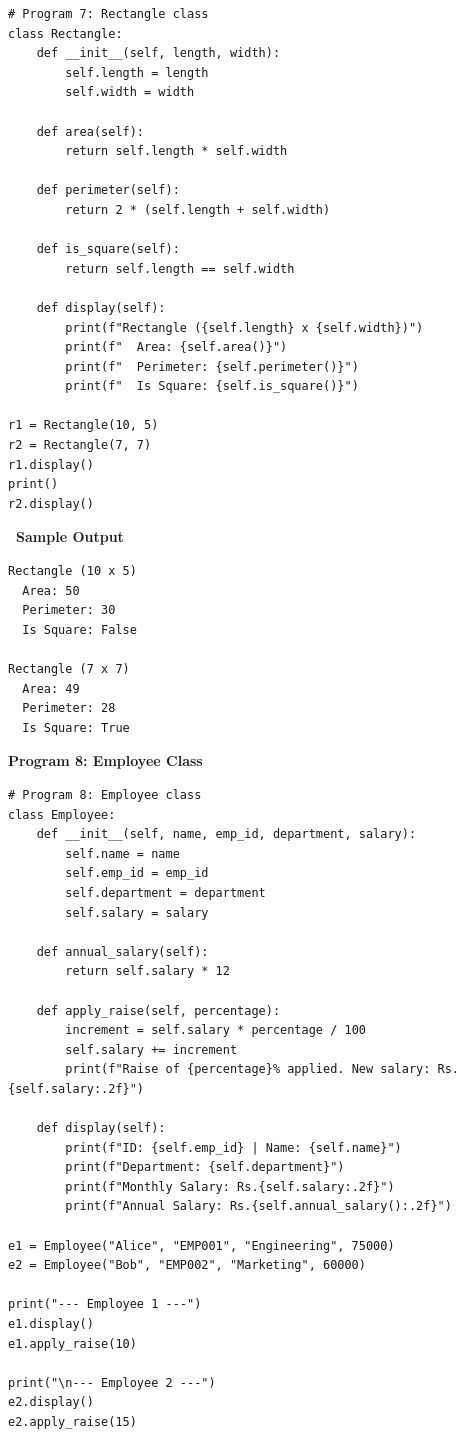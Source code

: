 \documentclass[12pt,a4paper]{article}
\newcommand{\outhead}{\noindent\colorbox{cmrgreen!25}%
  {\textbf{\small\color{cmrdark}~Sample Output~}}\par\vspace{-1pt}}
\begin{document}
\begin{lstlisting}
# Program 7: Rectangle class
class Rectangle:
    def __init__(self, length, width):
        self.length = length
        self.width = width

    def area(self):
        return self.length * self.width

    def perimeter(self):
        return 2 * (self.length + self.width)

    def is_square(self):
        return self.length == self.width

    def display(self):
        print(f"Rectangle ({self.length} x {self.width})")
        print(f"  Area: {self.area()}")
        print(f"  Perimeter: {self.perimeter()}")
        print(f"  Is Square: {self.is_square()}")

r1 = Rectangle(10, 5)
r2 = Rectangle(7, 7)
r1.display()
print()
r2.display()
\end{lstlisting}

\outhead
\begin{lstlisting}[style=outputstyle]
Rectangle (10 x 5)
  Area: 50
  Perimeter: 30
  Is Square: False

Rectangle (7 x 7)
  Area: 49
  Perimeter: 28
  Is Square: True
\end{lstlisting}

\vspace{0.5cm}

\textbf{Program 8: Employee Class}

\begin{lstlisting}
# Program 8: Employee class
class Employee:
    def __init__(self, name, emp_id, department, salary):
        self.name = name
        self.emp_id = emp_id
        self.department = department
        self.salary = salary

    def annual_salary(self):
        return self.salary * 12

    def apply_raise(self, percentage):
        increment = self.salary * percentage / 100
        self.salary += increment
        print(f"Raise of {percentage}% applied. New salary: Rs.{self.salary:.2f}")

    def display(self):
        print(f"ID: {self.emp_id} | Name: {self.name}")
        print(f"Department: {self.department}")
        print(f"Monthly Salary: Rs.{self.salary:.2f}")
        print(f"Annual Salary: Rs.{self.annual_salary():.2f}")

e1 = Employee("Alice", "EMP001", "Engineering", 75000)
e2 = Employee("Bob", "EMP002", "Marketing", 60000)

print("--- Employee 1 ---")
e1.display()
e1.apply_raise(10)

print("\n--- Employee 2 ---")
e2.display()
e2.apply_raise(15)
\end{lstlisting}
\end{document}
